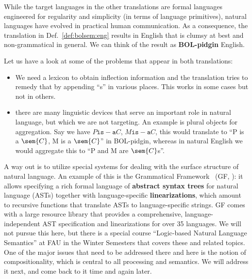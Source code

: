 \begin{remark}
While the target languages in the other translations are formal languages engineered for regularity and simplicity (in terms of language primitives), natural languages have evolved in practical human communication.
As a consequence, the translation in Def.~\ref{def:bolsem:eng} results in English that is clumsy at best and non-grammatical in general.
We can think of the result as \textbf{BOL-pidgin} English.

Let us have a look at some of the problems that appear in both translations:
\begin{itemize}
\item We need a lexicon to obtain inflection information and the translation tries to remedy that by appending ``s'' in various places.
This works in some cases but not in others.
\item there are many linguistic devices that serve an important role in natural language, but which we are not targeting.
An example is plural objects for aggregation.
Say we have $P \mathtt{is-a} C$, $M \mathtt{is-a} C$, this would translate to ``P is a $\sem{C}$, M is a $\sem{C}$'' in BOL-pidgin, whereas in natural English we would aggregate this to ``P and M are $\sem{C}$s''.
\end{itemize}

A way out is to utilize special systems for dealing with the surface structure of natural language.
An example of this is the Grammatical Framework~ (GF, \cite{gf}): it allows specifying a rich formal language of \textbf{abstract syntax trees} for natural language (ASTs) together with language-specific \textbf{linearizations}, which amount to recursive functions that translate ASTs to language-specific strings.
GF comes with  a large resource library that provides a comprehensive, language-independent AST specification and linearizations for over 35 languages.
We will not pursue this here, but there is a special course ``Logic-based Natural Language Semantics'' at FAU in the Winter Semesters that covers these and related topics.
One of the major issues that need to be addressed there and here is the notion of compositionality, which is central to all processing and semantics. We will address it next, and come back to it time and again later. 
\end{remark}


